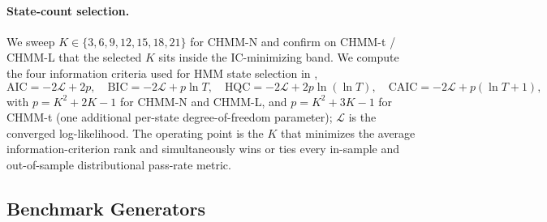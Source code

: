 \paragraph{State-count selection.}
We sweep $K \in \{3, 6, 9, 12, 15, 18, 21\}$ for CHMM-N and confirm on
CHMM-t / CHMM-L that the selected $K$ sits inside the IC-minimizing band.
We compute the four information criteria used for HMM state selection
in \citet{nguyen2018hidden},
\begin{equation}
    \text{AIC} = -2\mathcal{L} + 2p,\quad
    \text{BIC} = -2\mathcal{L} + p \ln T,\quad
    \text{HQC} = -2\mathcal{L} + 2p \ln(\ln T),\quad
    \text{CAIC} = -2\mathcal{L} + p(\ln T + 1),
    \label{eq:information_criteria}
\end{equation}
with $p = K^2 + 2K - 1$ for CHMM-N and CHMM-L, and $p = K^2 + 3K - 1$
for CHMM-t (one additional per-state degree-of-freedom parameter);
$\mathcal{L}$ is the converged log-likelihood.
The operating point is the $K$ that minimizes the average information-criterion
rank and simultaneously wins or ties every in-sample and out-of-sample
distributional pass-rate metric.

\subsection{Benchmark Generators}
\label{sec:benchmarks}

